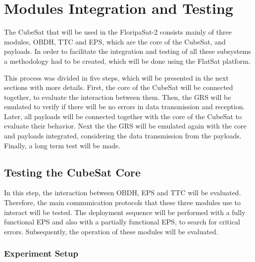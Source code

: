 %
%
%
%
%

%
%
%
%
%
%

\chapter{Modules Integration and Testing} \label{ch:modules-integration-and-testing}

The CubeSat that will be used in the FloripaSat-2 consists mainly of three modules, OBDH, TTC and EPS, which are the core of the CubeSat, and payloads. In order to facilitate the integration and testing of all these subsystems a methodology had to be created, which will be done using the FlatSat platform.

This process was divided in five steps, which will be presented in the next sections with more details. First, the core of the CubeSat will be connected together, to evaluate the interaction between them. Then, the GRS will be emulated to verify if there will be no errors in data transmission and reception. Later, all payloads will be connected together with the core of the CubeSat to evaluate their behavior. Next the the GRS will be emulated again with the core and payloads integrated, considering the data transmission from the payloads. Finally, a long term test will be made.

\section{Testing the CubeSat Core}

In this step, the interaction between OBDH, EPS and TTC will be evaluated. Therefore, the main communication protocols that these three modules use to interact will be tested. The deployment sequence will be performed with a fully functional EPS and also with a partially functional EPS, to search for critical errors. Subsequently, the operation of these modules will be evaluated.

\subsection{Experiment Setup}
\label{subsec:experiment-setup-1}

